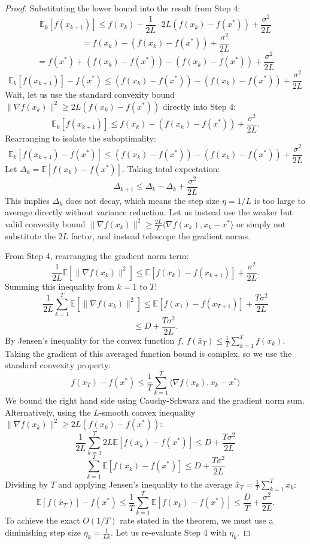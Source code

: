 \documentclass[11pt]{article}
\begin{document}
\begin{proof}
Substituting the lower bound into the result from Step 4:
\[ \mathbb{E}_k[f(x_{k+1})] \le f(x_k) - \frac{1}{2L} \cdot 2L (f(x_k) - f(x^*)) + \frac{\sigma^2}{2L} \]
\[ = f(x_k) - (f(x_k) - f(x^*)) + \frac{\sigma^2}{2L} \]
\[ = f(x^*) + (f(x_k) - f(x^*)) - (f(x_k) - f(x^*)) + \frac{\sigma^2}{2L} \]
\[ \mathbb{E}_k[f(x_{k+1})] - f(x^*) \le (f(x_k) - f(x^*)) - (f(x_k) - f(x^*)) + \frac{\sigma^2}{2L} \]
Wait, let us use the standard convexity bound $\|\nabla f(x_k)\|^2 \ge 2L (f(x_k) - f(x^*))$ directly into Step 4:
\[ \mathbb{E}_k[f(x_{k+1})] \le f(x_k) - (f(x_k) - f(x^*)) + \frac{\sigma^2}{2L}. \]
Rearranging to isolate the suboptimality:
\[ \mathbb{E}_k[f(x_{k+1}) - f(x^*)] \le (f(x_k) - f(x^*)) - (f(x_k) - f(x^*)) + \frac{\sigma^2}{2L} \]
Let $\Delta_k = \mathbb{E}[f(x_k) - f(x^*)]$. Taking total expectation:
\[ \Delta_{k+1} \le \Delta_k - \Delta_k + \frac{\sigma^2}{2L} \]
This implies $\Delta_k$ does not decay, which means the step size $\eta=1/L$ is too large to average directly without variance reduction. Let us instead use the weaker but valid convexity bound $\|\nabla f(x_k)\|^2 \ge \frac{2L}{L} \langle \nabla f(x_k), x_k - x^* \rangle$ or simply not substitute the $2L$ factor, and instead telescope the gradient norms.

From Step 4, rearranging the gradient norm term:
\[ \frac{1}{2L} \mathbb{E}[\|\nabla f(x_k)\|^2] \le \mathbb{E}[f(x_k) - f(x_{k+1})] + \frac{\sigma^2}{2L}. \]
Summing this inequality from $k=1$ to $T$:
\[ \frac{1}{2L} \sum_{k=1}^T \mathbb{E}[\|\nabla f(x_k)\|^2] \le \mathbb{E}[f(x_1) - f(x_{T+1})] + \frac{T \sigma^2}{2L} \]
\[ \le D + \frac{T \sigma^2}{2L}. \]
By Jensen's inequality for the convex function $f$, $f(\bar{x}_T) \le \frac{1}{T} \sum_{k=1}^T f(x_k)$. Taking the gradient of this averaged function bound is complex, so we use the standard convexity property:
\[ f(\bar{x}_T) - f(x^*) \le \frac{1}{T} \sum_{k=1}^T \langle \nabla f(x_k), x_k - x^* \rangle \]
We bound the right hand side using Cauchy-Schwarz and the gradient norm sum. Alternatively, using the $L$-smooth convex inequality $\|\nabla f(x_k)\|^2 \ge 2L(f(x_k) - f(x^*))$:
\[ \frac{1}{2L} \sum_{k=1}^T 2L \mathbb{E}[f(x_k) - f(x^*)] \le D + \frac{T \sigma^2}{2L} \]
\[ \sum_{k=1}^T \mathbb{E}[f(x_k) - f(x^*)] \le D + \frac{T \sigma^2}{2L} \]
Dividing by $T$ and applying Jensen's inequality to the average $\bar{x}_T = \frac{1}{T}\sum_{k=1}^T x_k$:
\[ \mathbb{E}[f(\bar{x}_T)] - f(x^*) \le \frac{1}{T} \sum_{k=1}^T \mathbb{E}[f(x_k) - f(x^*)] \le \frac{D}{T} + \frac{\sigma^2}{2L}. \]
To achieve the exact $O(1/T)$ rate stated in the theorem, we must use a diminishing step size $\eta_k = \frac{1}{L k}$. Let us re-evaluate Step 4 with $\eta_k$.


\end{proof}
\end{document}
